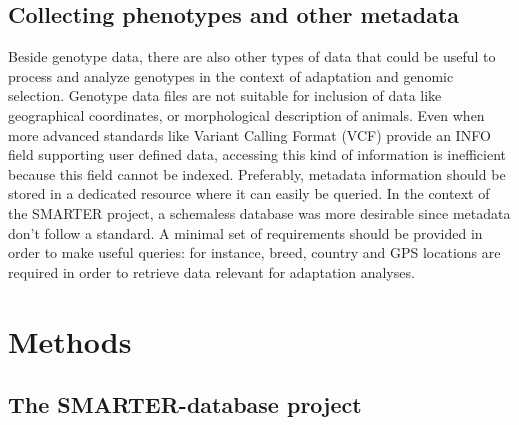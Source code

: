 \documentclass[a4paper,num-refs,gigabyte]{oup-contemporary}
\begin{document}
\subsection{Collecting phenotypes and other metadata}

Beside genotype data, there are also other types of data that could be useful to process and analyze genotypes in the context of adaptation and genomic selection. Genotype data files are not suitable for inclusion of data like geographical  coordinates, or morphological description of animals. Even when more advanced standards like Variant Calling Format (VCF) provide an INFO field supporting user defined data\citep{Danecek2011}, accessing this kind of information is inefficient  because this field cannot be  indexed.  Preferably, metadata information should be stored in a dedicated resource where it can easily be queried. In the context of the SMARTER project, a schemaless database was more desirable since metadata don't follow a standard. A minimal set of requirements should be provided in order to make useful queries: for instance, breed, country and GPS locations are required in order to retrieve data relevant for adaptation analyses.

\section{Methods}

\subsection{The SMARTER-database project}
\end{document}
